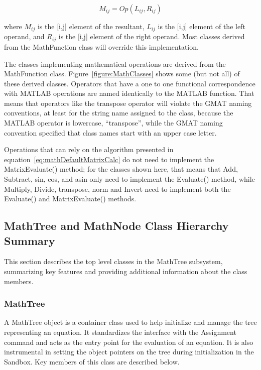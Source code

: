 \begin{equation}\label{eq:mathDefaultMatrixCalc}
M_{ij} = Op(L_{ij},R_{ij})
\end{equation}

\noindent where $M_{ij}$ is the [i,j] element of the resultant, $L_{ij}$ is the
[i,j] element of the left operand, and $R_{ij}$ is the [i,j] element of the
right operand.  Most classes derived from the MathFunction class will override
this implementation.

The classes implementing mathematical operations are derived from the MathFunction class.
Figure~\ref{figure:MathClasses} shows some (but not all) of these derived classes.  Operators that
have a one to one functional correspondence with MATLAB operations are named identically to the
MATLAB function.  That means that operators like the transpose operator will violate the GMAT naming
conventions, at least for the string name assigned to the class, because the MATLAB operator is
lowercase, ``transpose'', while the GMAT naming convention specified that class names start with an
upper case letter.

Operations that can rely on the algorithm presented in equation~\ref{eq:mathDefaultMatrixCalc} do
not need to implement the MatrixEvaluate() method; for the classes shown here, that means that Add,
Subtract, sin, cos, and asin only need to implement the Evaluate() method, while Multiply, Divide,
transpose, norm and Invert need to implement both the Evaluate() and MatrixEvaluate() methods.

\subsection{MathTree and MathNode Class Hierarchy Summary}

This section describes the top level classes in the MathTree subsystem, summarizing key features and
providing additional information about the class members.

\subsubsection{MathTree}

A MathTree object is a container class used to help initialize and manage the tree representing an
equation.  It standardizes the interface with the Assignment command and acts as the entry point for
the evaluation of an equation.  It is also instrumental in setting the object pointers on the tree
during initialization in the Sandbox.  Key members of this class are described below.

